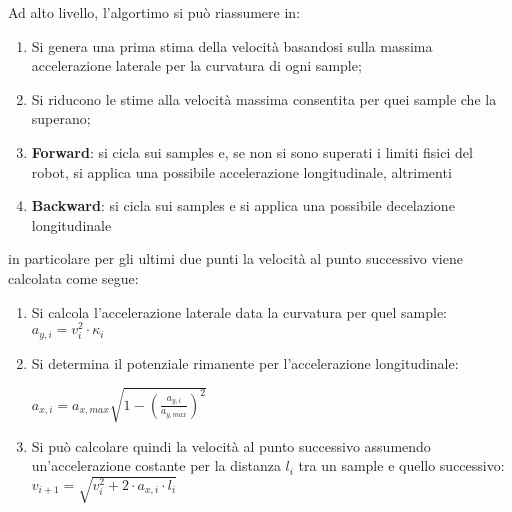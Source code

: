 Ad alto livello, l'algortimo si può riassumere in:
\begin{enumerate}
	\item Si genera una prima stima della velocità basandosi sulla massima accelerazione laterale per la
	      curvatura di ogni sample;
	\item Si riducono le stime alla velocità massima consentita per quei sample che la superano;
	\item \textbf{Forward}: si cicla sui samples e, se non si sono superati i limiti fisici del robot, si
		applica una possibile accelerazione longitudinale, altrimenti
	\item \textbf{Backward}: si cicla sui samples e si applica una possibile decelazione longitudinale
\end{enumerate}
in particolare per gli ultimi due punti la velocità al punto successivo viene calcolata come segue:
\begin{enumerate}

	\item \raggedright Si calcola l'accelerazione laterale data la curvatura per quel sample:\\
	      \centering $a_{y,i} = v_i^2 \cdot \kappa_i$ 

	\raggedright
	\item Si determina il potenziale rimanente per l'accelerazione longitudinale:\\
	      \begin{center}
			  $a_{x,i} = a_{x,max} \sqrt{\displaystyle 1- \left(\frac{a_{y,i}}{a_{y,max}}\right)^2}$
		  \end{center}

	\item Si può calcolare quindi la velocità al punto successivo assumendo un'accelerazione costante per
		la distanza $l_i$ tra un sample e quello successivo:\\
		\centering $v_{i+1} = \sqrt{v_i^2 + 2 \cdot a_{x,i} \cdot l_i}$
\end{enumerate}
